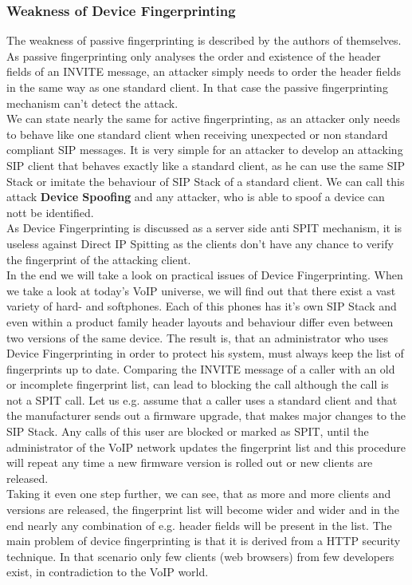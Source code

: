 \documentclass[final
	]{issa}
\begin{document}
\subsubsection{Weakness of Device Fingerprinting}
The weakness of passive fingerprinting is described by the authors of \cite{paper:fingerprint} themselves. As passive fingerprinting only analyses the order and existence of the header fields of an INVITE message, an attacker simply needs to order the header fields in the same way as one standard client. In that case the passive fingerprinting mechanism can't detect the attack.\\
We can state nearly the same for active fingerprinting, as an attacker only needs to behave like one standard client when receiving unexpected or non standard compliant SIP messages. It is very simple for an attacker to develop an attacking SIP client that behaves exactly like a standard client, as he can use the same SIP Stack or imitate the behaviour of SIP Stack of a standard client. We can call this attack \textbf{Device Spoofing} and any attacker, who is able to spoof a device can nott be identified.\\
As Device Fingerprinting is discussed as a server side anti SPIT mechanism, it is useless against Direct IP Spitting as the clients don't have any chance to verify the fingerprint of the attacking client.\\
In the end we will take a look on practical issues of Device Fingerprinting. When we take a look at today's VoIP universe, we will find out that there exist a vast variety of hard- and softphones. Each of this phones has it's own SIP Stack and even within a product family header layouts and behaviour differ even between two versions of the same device. The result is, that an administrator who uses Device Fingerprinting in order to protect his system, must always keep the list of fingerprints up to date. Comparing the INVITE message of a caller with an old or incomplete fingerprint list, can lead to blocking the call although the call is not a SPIT call. Let us e.g. assume that a caller uses a standard client and that the manufacturer sends out a firmware upgrade, that makes major changes to the SIP Stack. Any calls of this user are blocked or marked as SPIT, until the administrator of the VoIP network updates the fingerprint list and this procedure will repeat any time a new firmware version is rolled out or new clients are released.\\
Taking it even one step further, we can see, that as more and more clients and versions are released, the fingerprint list will become wider and wider and in the end nearly any combination of e.g. header fields will be present in the list. The main problem of device fingerprinting is that it is derived from a HTTP security technique. In that scenario only few clients (web browsers) from few developers exist, in contradiction to the VoIP world.
\end{document}
